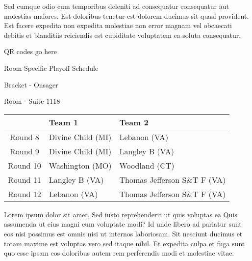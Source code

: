 \documentclass{article}%
\begin{document}
\newline%
Sed cumque odio eum temporibus deleniti ad consequatur consequatur aut molestias maiores. Est doloribus tenetur est dolorem ducimus sit quasi provident. Est facere expedita non expedita molestiae non error magnam vel obcaecati debitis et blanditiis reiciendis est cupiditate voluptatem ea soluta consequatur.%
\vspace*{140pt}%
\begin{center}%
\begin{Huge}%
QR codes go here%
\end{Huge}%
\end{center}%
\newpage%
\begin{center}%
\begin{Huge}%
Room Specific Playoff Schedule%
\end{Huge}%
\vspace*{8pt}%
\linebreak%
\begin{Large}%
Bracket {-} Onsager%
\end{Large}%
\vspace*{8pt}%
\linebreak%
\vspace*{8pt}%
\begin{Large}%
Room {-} Suite 1118%
\end{Large}%
\end{center}%
%
\begin{tabularx}{\textwidth}{|c|Y|Y|}%
\hline%
&Team 1&Team 2\\%
\hline%
Round 8&Divine Child (MI)&Lebanon (VA)\\%
Round 9&Divine Child (MI)&Langley B (VA)\\%
Round 10&Washington (MO)&Woodland (CT)\\%
Round 11&Langley B (VA)&Thomas Jefferson S\&T F (VA)\\%
Round 12&Lebanon (VA)&Thomas Jefferson S\&T F (VA)\\%
\hline%
\end{tabularx}%
\vspace*{8pt}%
\newline%
Lorem ipsum dolor sit amet. Sed iusto reprehenderit ut quis voluptas ea Quis assumenda ut eius magni eum voluptate modi? Id unde libero ad pariatur sunt eos nisi possimus est omnis nisi ut internos laboriosam. Sit nesciunt ducimus et totam maxime est voluptas vero sed itaque nihil. Et expedita culpa et fuga sunt quo esse ipsam eos doloribus autem rem perferendis modi et molestiae vitae.\newline%
\end{document}
